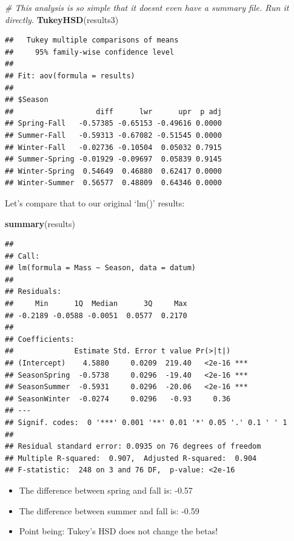 \documentclass[
]{article}
\newenvironment{Shaded}{\begin{snugshade}}{\end{snugshade}}
\newcommand{\CommentTok}[1]{\textcolor[rgb]{0.56,0.35,0.01}{\textit{#1}}}
\newcommand{\FunctionTok}[1]{\textcolor[rgb]{0.13,0.29,0.53}{\textbf{#1}}}
\newcommand{\NormalTok}[1]{#1}
\providecommand{\tightlist}{%
  \setlength{\itemsep}{0pt}\setlength{\parskip}{0pt}}
\begin{document}
\begin{Shaded}
\begin{Highlighting}[]
\CommentTok{\# This analysis is so simple that it doesn\textquotesingle{}t even have a summary file. Run it directly.}
\FunctionTok{TukeyHSD}\NormalTok{(results3)}
\end{Highlighting}
\end{Shaded}

\begin{verbatim}
##   Tukey multiple comparisons of means
##     95% family-wise confidence level
## 
## Fit: aov(formula = results)
## 
## $Season
##                   diff      lwr      upr  p adj
## Spring-Fall   -0.57385 -0.65153 -0.49616 0.0000
## Summer-Fall   -0.59313 -0.67082 -0.51545 0.0000
## Winter-Fall   -0.02736 -0.10504  0.05032 0.7915
## Summer-Spring -0.01929 -0.09697  0.05839 0.9145
## Winter-Spring  0.54649  0.46880  0.62417 0.0000
## Winter-Summer  0.56577  0.48809  0.64346 0.0000
\end{verbatim}

Let's compare that to our original `lm()' results:

\begin{Shaded}
\begin{Highlighting}[]
\FunctionTok{summary}\NormalTok{(results)}
\end{Highlighting}
\end{Shaded}

\begin{verbatim}
## 
## Call:
## lm(formula = Mass ~ Season, data = datum)
## 
## Residuals:
##     Min      1Q  Median      3Q     Max 
## -0.2189 -0.0588 -0.0051  0.0577  0.2170 
## 
## Coefficients:
##              Estimate Std. Error t value Pr(>|t|)    
## (Intercept)    4.5880     0.0209  219.40   <2e-16 ***
## SeasonSpring  -0.5738     0.0296  -19.40   <2e-16 ***
## SeasonSummer  -0.5931     0.0296  -20.06   <2e-16 ***
## SeasonWinter  -0.0274     0.0296   -0.93     0.36    
## ---
## Signif. codes:  0 '***' 0.001 '**' 0.01 '*' 0.05 '.' 0.1 ' ' 1
## 
## Residual standard error: 0.0935 on 76 degrees of freedom
## Multiple R-squared:  0.907,  Adjusted R-squared:  0.904 
## F-statistic:  248 on 3 and 76 DF,  p-value: <2e-16
\end{verbatim}

\begin{itemize}
\tightlist
\item
  The difference between spring and fall is: -0.57
\item
  The difference between summer and fall is: -0.59
\item
  Point being: Tukey's HSD does not change the betas!
\end{itemize}
\end{document}
